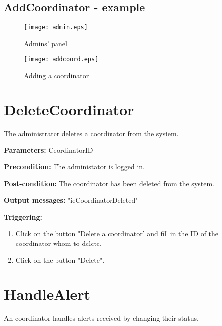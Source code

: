 \subsection{AddCoordinator - example}

\begin{figure}
    \texttt{[image: admin.eps]}
	\caption{Admins' panel}
\end{figure}

\begin{figure}
    \texttt{[image: addcoord.eps]}
	\caption{Adding a coordinator}
\end{figure}



\section{DeleteCoordinator}
\label{operation:DeleteCoordinator}

The administrator deletes a coordinator from the system.

\begin{description}
	\item \textbf{Parameters:} CoordinatorID
	\item \textbf{Precondition:} The administator is logged in.
	\item \textbf{Post-condition:} The coordinator has been deleted from the
	system.
	\item \textbf{Output messages:} "ieCoordinatorDeleted"
	
	\item \textbf{Triggering:}
	
	\begin{enumerate}
		\item Click on the button "Delete a coordinator' and fill in the ID of the
		coordinator whom to delete.
		\item Click on the button "Delete". %
	\end{enumerate}
\end{description}

\section{HandleAlert}
\label{operation:HandleAlert}

An coordinator handles alerts received by changing their status.

